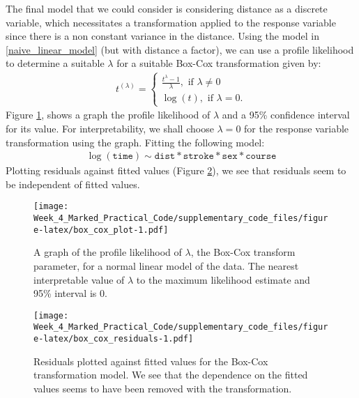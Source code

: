 \documentclass[a4paper,11pt]{article}
\begin{document}
The final model that we could consider is considering distance as a discrete variable, which necessitates a transformation applied to the response variable since there is a non constant variance in the distance. Using the model in \eqref{naive_linear_model} (but with distance a factor), we can use a profile likelihood to determine a suitable $\lambda$ for a suitable Box-Cox transformation given by:
\begin{align}
  t^{(\lambda)} =
    \begin{cases}
      \frac{t^\lambda - 1}{\lambda}, \text{ if } \lambda \neq 0 \\
      \log(t), \text{ if } \lambda = 0.
    \end{cases}
\end{align}
Figure \ref{box_cox_plot}, shows a graph the profile likelihood of $\lambda$ and a 95\% confidence interval for its value. For interpretability, we shall choose $\lambda = 0$ for the response variable transformation using the graph.
Fitting the following model:
\begin{align}
  \log(\texttt{time}) \sim \texttt{dist}*\texttt{stroke}*\texttt{sex}*\texttt{course} \label{box_cox_model}
\end{align}
Plotting residuals against fitted values (Figure \ref{box_cox_residuals}), we see that residuals seem to be independent of fitted values.

\begin{figure}
  \centering
  \texttt{[image: Week\_4\_Marked\_Practical\_Code/supplementary\_code\_files/figure-latex/box\_cox\_plot-1.pdf]}
  \caption{A graph of the profile likelihood of $\lambda$, the Box-Cox transform parameter, for a normal linear model of the data. The nearest interpretable value of $\lambda$ to the maximum likelihood estimate and 95\% interval is 0.}
  \label{box_cox_plot}
\end{figure}

\begin{figure}
  \centering
  \texttt{[image: Week\_4\_Marked\_Practical\_Code/supplementary\_code\_files/figure-latex/box\_cox\_residuals-1.pdf]}
  \caption{Residuals plotted against fitted values for the Box-Cox transformation model. We see that the dependence on the fitted values seems to have been removed with the transformation.}
  \label{box_cox_residuals}
\end{figure}
\end{document}
